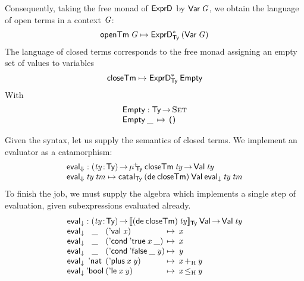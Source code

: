 \newcommand{\SYMBEmpty}{\F{Empty}\xspace}
\newcommand{\Empty}[1]{\SYMBEmpty\:#1}

\newcommand{\SYMBopenTerm}{\F{openTm}\xspace}
\newcommand{\openTerm}[1]{\SYMBopenTerm\: #1}
\newcommand{\closeTerm}{\F{closeTm}}

Consequently, taking the free monad of \(\HExprD\) by \(\SYMBVar\:
\V{G}\), we obtain the language of open terms in a context \(\V{G}\):
%
\[
\openTerm{\V{G}} \mapsto \FreeIMonad{\HExprD}{\Ty}{(\SYMBVar\:\V{G})}
\]
%
The language of closed terms corresponds to the free monad assigning
an empty set of values to variables
%
\[
\closeTerm \mapsto \FreeIMonad{\HExprD}{\Ty}{\SYMBEmpty}
\]
%
With
%
\[\stk{
\SYMBEmpty : \Ty \To \Set \\
\begin{array}{@{}l@{\:\:\mapsto\:\:}l}
\Empty{\_}   & \Zero \\
\end{array}
}\]
%


\newcommand{\evalH}{\F{eval}_{\green{\Downarrow}}}
\newcommand{\evalOne}{\F{eval}_{\green{\downarrow}}}

Given the syntax, let us supply the semantics of closed terms. We
implement an evaluator as a catamorphism:
%
\[\stk{
\evalH : \PI{\V{ty}}{\Ty} 
           \muide{\Ty}{\closeTerm}{\:\V{ty}} \To
           \Val{\V{ty}} \\
\evalH\: \V{ty}\: \V{tm} \mapsto \cataI_{\Ty} \:
                                 (\toIDesc{\closeTerm})\: 
                                 \SYMBVal\: 
                                 \evalOne\: 
                                 \V{ty}\: 
                                 \V{tm}
}\]
%
To finish the job, we must supply the algebra which implements a single
step of evaluation, given subexpressions evaluated already.
%
\[\stk{
\evalOne : \PI{\V{ty}}{\Ty}
 \idescop{(\toIDesc{\closeTerm})\:\V{ty}}{\Ty}{\SYMBVal}
           \To {\Val{\V{ty}}} \\
\begin{array}{@{}l@{}c@{}l@{\:\mapsto\:\:}l}
\evalOne\: & \_\: & (\SYMBEval\;\V{x})                   & \V{x} \\
\evalOne\: & \_\: & (\SYMBEcond\:\BoolTrue\:\V{x}\:\_)   & \V{x} \\
\evalOne\: & \_\: & (\SYMBEcond\:\BoolFalse\:\_\:\V{y})  & \V{y} \\
\evalOne\: & \Enat\: & (\SYMBEplus\:\V{x}\:\V{y})   & \V{x} \plusHost \V{y} \\
\evalOne\: & \Ebool\: & (\SYMBEle\:\V{x}\:\V{y})  & \V{x} \leHost \V{y} 
\end{array}
}\]



